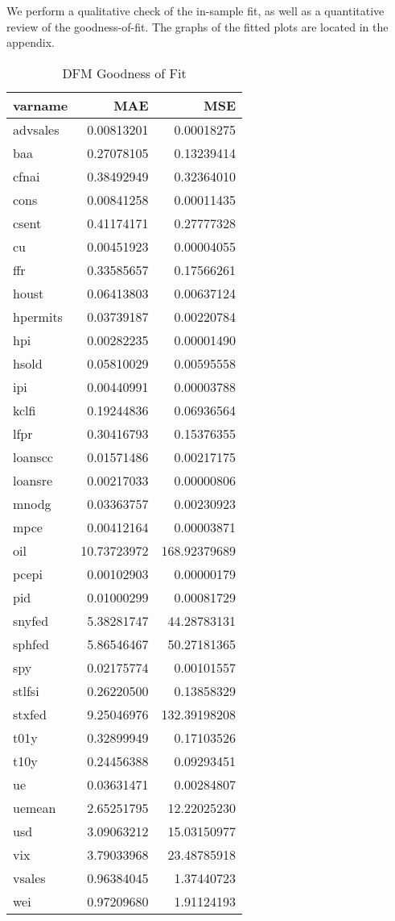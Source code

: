 \documentclass[11pt, letterpaper]{article}\usepackage[]{graphicx}\usepackage[]{color}
\begin{document}
We perform a qualitative check of the in-sample fit, as well as a quantitative review of the goodness-of-fit. The graphs of the fitted plots are located in the appendix.
\begin{table}[H]
\centering
\begingroup\footnotesize
\begin{tabular}{lrr}
  \hline
varname & MAE & MSE \\ 
  \hline
advsales & 0.00813201 & 0.00018275 \\ 
  baa & 0.27078105 & 0.13239414 \\ 
  cfnai & 0.38492949 & 0.32364010 \\ 
  cons & 0.00841258 & 0.00011435 \\ 
  csent & 0.41174171 & 0.27777328 \\ 
  cu & 0.00451923 & 0.00004055 \\ 
  ffr & 0.33585657 & 0.17566261 \\ 
  houst & 0.06413803 & 0.00637124 \\ 
  hpermits & 0.03739187 & 0.00220784 \\ 
  hpi & 0.00282235 & 0.00001490 \\ 
  hsold & 0.05810029 & 0.00595558 \\ 
  ipi & 0.00440991 & 0.00003788 \\ 
  kclfi & 0.19244836 & 0.06936564 \\ 
  lfpr & 0.30416793 & 0.15376355 \\ 
  loanscc & 0.01571486 & 0.00217175 \\ 
  loansre & 0.00217033 & 0.00000806 \\ 
  mnodg & 0.03363757 & 0.00230923 \\ 
  mpce & 0.00412164 & 0.00003871 \\ 
  oil & 10.73723972 & 168.92379689 \\ 
  pcepi & 0.00102903 & 0.00000179 \\ 
  pid & 0.01000299 & 0.00081729 \\ 
  snyfed & 5.38281747 & 44.28783131 \\ 
  sphfed & 5.86546467 & 50.27181365 \\ 
  spy & 0.02175774 & 0.00101557 \\ 
  stlfsi & 0.26220500 & 0.13858329 \\ 
  stxfed & 9.25046976 & 132.39198208 \\ 
  t01y & 0.32899949 & 0.17103526 \\ 
  t10y & 0.24456388 & 0.09293451 \\ 
  ue & 0.03631471 & 0.00284807 \\ 
  uemean & 2.65251795 & 12.22025230 \\ 
  usd & 3.09063212 & 15.03150977 \\ 
  vix & 3.79033968 & 23.48785918 \\ 
  vsales & 0.96384045 & 1.37440723 \\ 
  wei & 0.97209680 & 1.91124193 \\ 
   \hline
\end{tabular}
\endgroup
\caption{DFM Goodness of Fit} 
\end{table}
\end{document}
